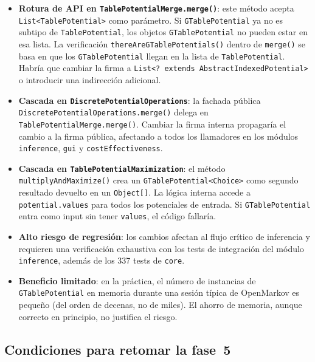\documentclass[11pt,a4paper]{article}
\newcommand{\code}[1]{\texttt{#1}}
\begin{document}
\begin{itemize}
  \item \textbf{Rotura de API en \code{Table\-Potential\-Merge.\-merge()}}: este
        método acepta \code{List<\-Table\-Potential>} como parámetro.  Si
        \code{GTablePotential} ya no es subtipo de \code{TablePotential}, los
        objetos \code{GTablePotential} no pueden estar en esa lista.  La
        verificación \code{there\-Are\-GTable\-Potentials()} dentro de
        \code{merge()} se basa en que los \code{GTablePotential} llegan en la
        lista de \code{TablePotential}.  Habría que cambiar la firma a
        \code{List<? extends Abstract\-Indexed\-Poten\-tial>} o introducir una
        indirección adicional.

  \item \textbf{Cascada en \code{Discrete\-Potential\-Operations}}: la fachada
        pública \code{Discrete\-Potential\-Operations.\-merge()} delega en
        \code{Table\-Potential\-Merge.\-merge()}.  Cambiar la firma interna propagaría
        el cambio a la firma pública, afectando a todos los llamadores en
        los módulos \code{inference}, \code{gui} y \code{costEffectiveness}.

  \item \textbf{Cascada en \code{TablePotentialMaximization}}: el método
        \code{multiplyAndMaximize()} crea un \code{GTablePotential<Choice>} como
        segundo resultado devuelto en un \code{Object[]}.  La lógica interna
        accede a \code{potential.values} para todos los potenciales de entrada.
        Si \code{GTablePotential} entra como input sin tener \code{values}, el
        código fallaría.

  \item \textbf{Alto riesgo de regresión}: los cambios afectan al flujo crítico
        de inferencia y requieren una verificación exhaustiva con los tests de
        integración del módulo \code{inference}, además de los 337 tests de
        \code{core}.

  \item \textbf{Beneficio limitado}: en la práctica, el número de instancias de
        \code{GTablePotential} en memoria durante una sesión típica de
        OpenMarkov es pequeño (del orden de decenas, no de miles).  El ahorro
        de memoria, aunque correcto en principio, no justifica el riesgo.
\end{itemize}

\subsection{Condiciones para retomar la fase~5}
\end{document}
